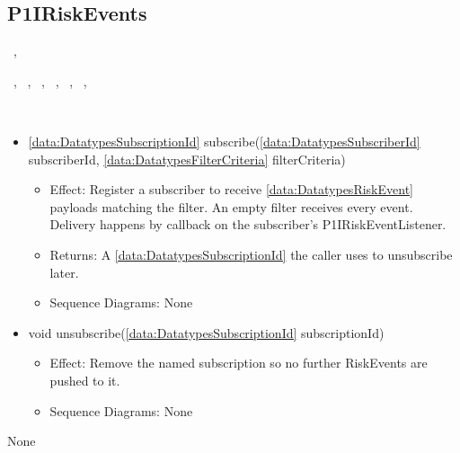   \subsection{P1IRiskEvents}\label{int:InterfacesP1IRiskEvents}
    \begin{description}
      \item[Provided by:] \iconcomponent{}~, \iconcomponent{}~
      \item[Required by:] \iconcomponent{}~, \iconcomponent{}~, \iconcomponent{}~, \iconcomponent{}~, \iconcomponent{}~, \iconcomponent{}~, \iconcomponent{}~ 
      \item[Operations:] ~
    \begin{itemize}[noitemsep,nolistsep,leftmargin=-.25cm]
      \item \textsf{\ref{data:DatatypesSubscriptionId} subscribe(\ref{data:DatatypesSubscriberId} subscriberId, \ref{data:DatatypesFilterCriteria} filterCriteria)}
        \begin{itemize}[noitemsep,nolistsep]
           \item Effect: Register a subscriber to receive \ref{data:DatatypesRiskEvent} payloads matching the filter. An empty filter receives every event. Delivery happens by callback on the subscriber's P1IRiskEventListener. 
           \item Returns: A \ref{data:DatatypesSubscriptionId} the caller uses to unsubscribe later.
           \item Sequence Diagrams: None
        \end{itemize}
      \item \textsf{void unsubscribe(\ref{data:DatatypesSubscriptionId} subscriptionId)}
        \begin{itemize}[noitemsep,nolistsep]
           \item Effect: Remove the named subscription so no further RiskEvents are pushed to it. 
           \item Sequence Diagrams: None
        \end{itemize}
    \end{itemize}
      \item[Diagrams:] None
    \end{description}

